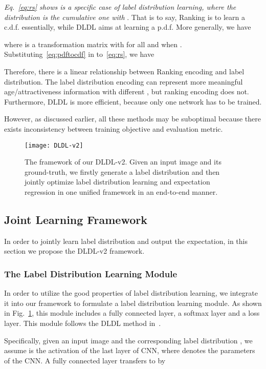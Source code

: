 \documentclass[5p,times,twocolumn]{elsarticle}
\begin{document}
\emph{Eq.~\eqref{eq:rs} shows  is a specific case of label distribution learning, where the distribution is the cumulative one with }. That is to say, Ranking is to learn a c.d.f. essentially, while DLDL aims at learning a p.d.f. More generally, we have

where  is a transformation matrix with   for all  and  when . Substituting~\eqref{eq:pdftocdf} in to~\eqref{eq:rs}, we have

Therefore, there is a linear relationship between Ranking encoding and label distribution. The label distribution encoding  can represent more meaningful age/attractiveness information with different , but ranking encoding   does not. Furthermore, DLDL is more efficient, because only one network has to be trained. 

However, as discussed earlier, all these methods may be suboptimal because there exists inconsistency between training objective and evaluation metric.

\begin{figure}
 \centering
 \texttt{[image: DLDL-v2]}
\caption{The framework of our DLDL-v2. Given an input image and its ground-truth, we firstly generate a label distribution and then jointly optimize label distribution learning and expectation regression in one unified framework in an end-to-end manner.} \label{fig:dldlv2f}
\vspace{-5pt}
\end{figure}

\subsection{Joint Learning Framework}
In order to jointly learn label distribution and output the expectation, in this section we propose the DLDL-v2 framework.

\subsubsection{The Label Distribution Learning Module}
In order to utilize the good properties of label distribution learning, we integrate it into our framework to formulate a label distribution learning module. As shown in Fig.~\ref{fig:dldlv2f}, this module includes a fully connected layer, a softmax layer and a loss layer. This module follows the DLDL method in~\cite{gao2017deep}.

Specifically, given an input image  and the corresponding label distribution , we assume  is the activation of the last layer of CNN, where  denotes the parameters of the CNN. A fully connected layer transfers 
 to  by
\end{document}
